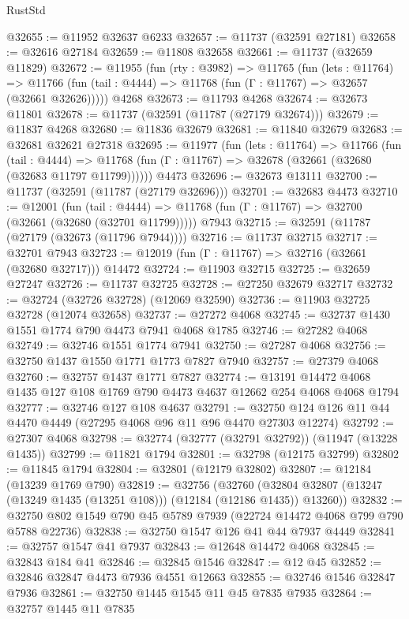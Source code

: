 \begin{lexlean}{RustStd}
\begin{coremodule}
@32655 := @11952 @32637 @6233
@32657 := @11737 (@32591 @27181)
@32658 := @32616 @27184
@32659 := @11808 @32658
@32661 := @11737 (@32659 @11829)
@32672 := @11955
    (fun (rty : @3982) =>
    @11765
      (fun (lets : @11764) =>
      @11766 (fun (tail : @4444) => @11768 (fun (Γ : @11767) => @32657 (@32661 @32626)))))
    @4268
@32673 := @11793 @4268
@32674 := @32673 @11801
@32678 := @11737 (@32591 (@11787 (@27179 @32674)))
@32679 := @11837 @4268
@32680 := @11836 @32679
@32681 := @11840 @32679
@32683 := @32681 @32621 @27318
@32695 := @11977
    (fun (lets : @11764) =>
    @11766
      (fun (tail : @4444) =>
      @11768 (fun (Γ : @11767) => @32678 (@32661 (@32680 (@32683 @11797 @11799))))))
    @4473
@32696 := @32673 @13111
@32700 := @11737 (@32591 (@11787 (@27179 @32696)))
@32701 := @32683 @4473
@32710 := @12001
    (fun (tail : @4444) => @11768 (fun (Γ : @11767) => @32700 (@32661 (@32680 (@32701 @11799)))))
    @7943
@32715 := @32591 (@11787 (@27179 (@32673 (@11796 @7944))))
@32716 := @11737 @32715
@32717 := @32701 @7943
@32723 := @12019 (fun (Γ : @11767) => @32716 (@32661 (@32680 @32717))) @14472
@32724 := @11903 @32715
@32725 := @32659 @27247
@32726 := @11737 @32725
@32728 := @27250 @32679 @32717
@32732 := @32724 (@32726 @32728) (@12069 @32590)
@32736 := @11903 @32725 @32728 (@12074 @32658)
@32737 := @27272 @4068
@32745 := @32737 @1430 @1551 @1774 @790 @4473 @7941 @4068 @1785
@32746 := @27282 @4068
@32749 := @32746 @1551 @1774 @7941
@32750 := @27287 @4068
@32756 := @32750 @1437 @1550 @1771 @1773 @7827 @7940
@32757 := @27379 @4068
@32760 := @32757 @1437 @1771 @7827
@32774 := @13191 @14472 @4068 @1435 @127 @108 @1769 @790 @4473 @4637 @12662 @254 @4068 @4068 @1794
@32777 := @32746 @127 @108 @4637
@32791 := @32750 @124 @126 @11 @44 @4470 @4449 (@27295 @4068 @96 @11 @96 @4470 @27303 @12274)
@32792 := @27307 @4068
@32798 := @32774 (@32777 (@32791 @32792)) (@11947 (@13228 @1435))
@32799 := @11821 @1794
@32801 := @32798 (@12175 @32799)
@32802 := @11845 @1794
@32804 := @32801 (@12179 @32802)
@32807 := @12184 (@13239 @1769 @790)
@32819 := @32756
    (@32760 (@32804 @32807 (@13247 (@13249 @1435 (@13251 @108))) (@12184 (@12186 @1435)) @13260))
@32832 := @32750 @802 @1549 @790 @45 @5789 @7939 (@22724 @14472 @4068 @799 @790 @5788 @22736)
@32838 := @32750 @1547 @126 @41 @44 @7937 @4449
@32841 := @32757 @1547 @41 @7937
@32843 := @12648 @14472 @4068
@32845 := @32843 @184 @41
@32846 := @32845 @1546
@32847 := @12 @45
@32852 := @32846 @32847 @4473 @7936 @4551 @12663
@32855 := @32746 @1546 @32847 @7936
@32861 := @32750 @1445 @1545 @11 @45 @7835 @7935
@32864 := @32757 @1445 @11 @7835

\end{coremodule}
\end{lexlean}
